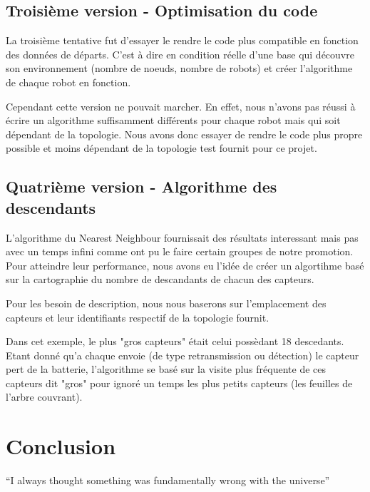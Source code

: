 \documentclass{article}
\begin{document}
\subsection{Troisième version - Optimisation du code}
La troisième tentative fut d'essayer le rendre le code plus compatible en fonction des données de départs. C'est à dire en condition réelle d'une base qui découvre son environnement (nombre de noeuds, nombre de robots) et créer l'algorithme de chaque robot en fonction.

Cependant cette version ne pouvait marcher. En effet, nous n'avons pas réussi à écrire un algorithme suffisamment différents pour chaque robot mais qui soit dépendant de la topologie. Nous avons donc essayer de rendre le code plus propre possible et moins dépendant de la topologie test fournit pour ce projet.

\subsection{Quatrième version - Algorithme des descendants}
L'algorithme du Nearest Neighbour fournissait des résultats interessant mais pas avec un temps infini comme ont pu le faire certain groupes de notre promotion. Pour atteindre leur performance, nous avons eu l'idée de créer un algortihme basé sur la cartographie du nombre de descandants de chacun des capteurs.

Pour les besoin de description, nous nous baserons sur l'emplacement des capteurs et leur identifiants respectif de la topologie fournit.

Dans cet exemple, le plus "gros capteurs" était celui possèdant 18 descedants. Etant donné qu'a chaque envoie (de type retransmission ou détection) le capteur pert de la batterie, l'algorithme se basé sur la visite plus fréquente de ces capteurs dit "gros" pour ignoré un temps les plus petits capteurs (les feuilles de l'arbre couvrant).

\section{Conclusion}
``I always thought something was fundamentally wrong with the universe'' \citep{adams1995hitchhiker}



\end{document}
